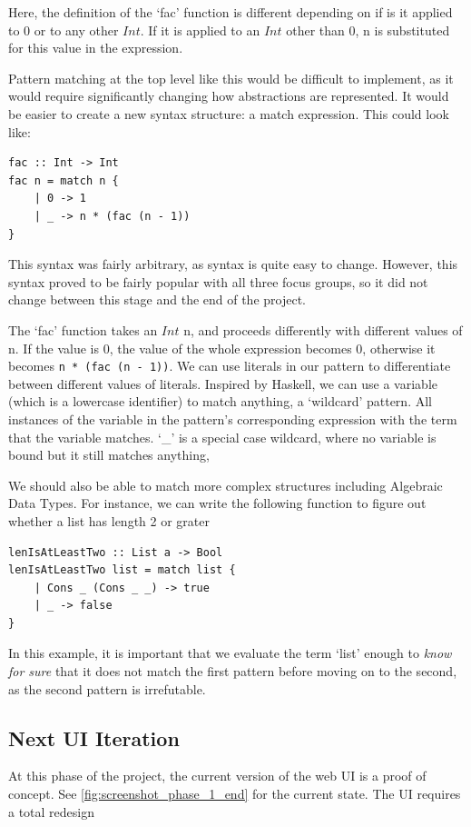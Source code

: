 Here, the definition of the `fac' function is different depending on if is it applied to $0$ or to any other $Int$. If it is applied to an $Int$ other than 0, n is substituted for this value in the expression.

Pattern matching at the top level like this would be difficult to implement, as it would require significantly changing how abstractions are represented. It would be easier to create a new syntax structure: a match expression. This could look like:

\begin{lstlisting}[language=SFL]
fac :: Int -> Int
fac n = match n {
    | 0 -> 1
    | _ -> n * (fac (n - 1))
}
\end{lstlisting}
This syntax was fairly arbitrary, as syntax is quite easy to change. However, this syntax proved to be fairly popular with all three focus groups, so it did not change between this stage and the end of the project.

The `fac' function takes an $Int$ n, and proceeds differently with different values of n. If the value is 0, the value of the whole expression becomes 0, otherwise it becomes \lstinline[language=SFL]!n * (fac (n - 1))!. We can use literals in our pattern to differentiate between different values of literals. Inspired by Haskell, we can use a variable (which is a lowercase identifier) to match anything, a `wildcard' pattern. All instances of the variable in the pattern's corresponding expression with the term that the variable matches. `\_' is a special case wildcard, where no variable is bound but it still matches anything, 

We should also be able to match more complex structures including Algebraic Data Types. For instance, we can write the following function to figure out whether a list has length 2 or grater

\begin{lstlisting}[language=SFL]
lenIsAtLeastTwo :: List a -> Bool
lenIsAtLeastTwo list = match list {
    | Cons _ (Cons _ _) -> true
    | _ -> false
}    
\end{lstlisting}

\noindent In this example, it is important that we evaluate the term `list' enough to \textit{know for sure} that it does not match the first pattern before moving on to the second, as the second pattern is irrefutable. 

\subsection{Next UI Iteration}
\label{c2:next_ui}
At this phase of the project, the current version of the web UI is a proof of concept. See \ref{fig:screenshot_phase_1_end} for the current state. The UI requires a total redesign

